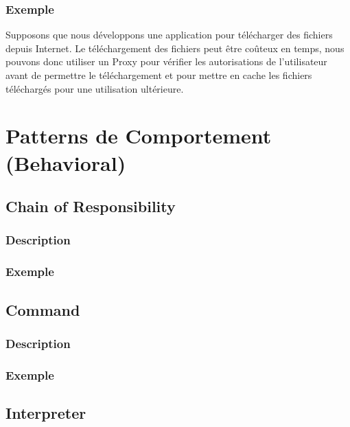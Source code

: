 \documentclass[french]{article}
\begin{document}
\subsubsection{Exemple}

Supposons que nous développons une application pour télécharger des fichiers depuis Internet. Le téléchargement des fichiers peut être coûteux en temps, nous pouvons donc utiliser un Proxy pour vérifier les autorisations de l'utilisateur avant de permettre le téléchargement et pour mettre en cache les fichiers téléchargés pour une utilisation ultérieure.




\newpage

\section{Patterns de Comportement (Behavioral)}

\subsection{Chain of Responsibility}

\subsubsection{Description}



\subsubsection{Exemple}



\subsection{Command}

\subsubsection{Description}



\subsubsection{Exemple}



\subsection{Interpreter}
\end{document}
